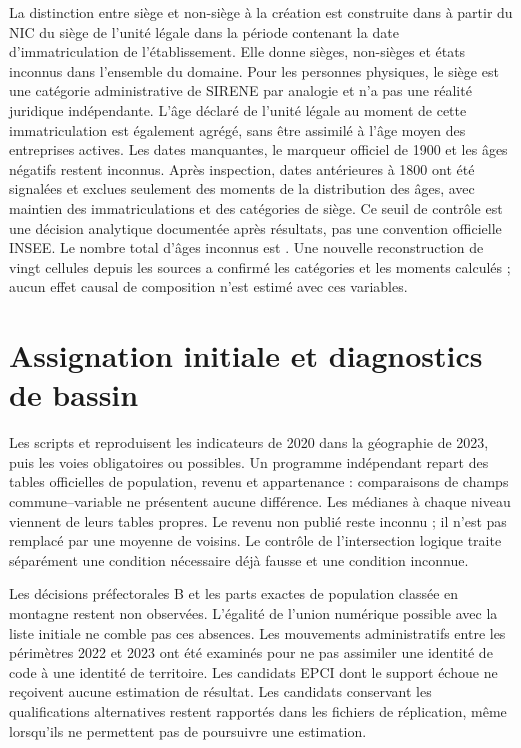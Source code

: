 La distinction entre siège et non-siège à la création est construite dans  à partir du NIC du siège de l’unité légale dans la période contenant la date d’immatriculation de l’établissement. Elle donne \HQBirthN{} sièges, \NonHQBirthN{} non-sièges et \UnknownHQN{} états inconnus dans l’ensemble du domaine. Pour les personnes physiques, le siège est une catégorie administrative de SIRENE par analogie et n’a pas une réalité juridique indépendante. L’âge déclaré de l’unité légale au moment de cette immatriculation est également agrégé, sans être assimilé à l’âge moyen des entreprises actives. Les dates manquantes, le marqueur officiel de 1900 et les âges négatifs restent inconnus. Après inspection, \AgeFlaggedN{} dates antérieures à 1800 ont été signalées et exclues seulement des moments de la distribution des âges, avec maintien des immatriculations et des catégories de siège. Ce seuil de contrôle est une décision analytique documentée après résultats, pas une convention officielle INSEE. Le nombre total d’âges inconnus est \UnknownAgeN{}. Une nouvelle reconstruction de vingt cellules depuis les sources a confirmé les catégories et les moments calculés ; aucun effet causal de composition n’est estimé avec ces variables.

\section{Assignation initiale et diagnostics de bassin}
Les scripts  et  reproduisent les indicateurs de 2020 dans la géographie de 2023, puis les voies obligatoires ou possibles. Un programme indépendant repart des tables officielles de population, revenu et appartenance : \AssignmentFieldChecksN{} comparaisons de champs commune–variable ne présentent aucune différence. Les médianes à chaque niveau viennent de leurs tables propres. Le revenu non publié reste inconnu ; il n’est pas remplacé par une moyenne de voisins. Le contrôle de l’intersection logique traite séparément une condition nécessaire déjà fausse et une condition inconnue.

Les décisions préfectorales B et les parts exactes de population classée en montagne restent non observées. L’égalité de l’union numérique possible avec la liste initiale ne comble pas ces absences. Les mouvements administratifs entre les périmètres 2022 et 2023 ont été examinés pour ne pas assimiler une identité de code à une identité de territoire. Les candidats EPCI dont le support échoue ne reçoivent aucune estimation de résultat. Les candidats conservant les qualifications alternatives restent rapportés dans les fichiers de réplication, même lorsqu’ils ne permettent pas de poursuivre une estimation.

